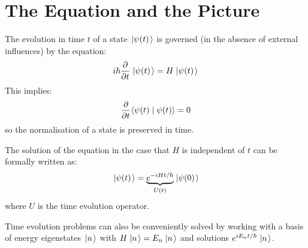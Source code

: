 \documentclass[../Main.tex]{subfiles}
\begin{document}
\section{The \schr Equation and the \schr Picture}
The evolution in time $t$ of a state $\left.\left|\psi(t)\right.\right\rangle$ is governed (in the absence of external influences) by the \schr equation:
\begin{equation}
    i\hbar \frac{\partial}{\partial t} \left.\left|\psi(t)\right.\right\rangle = H\left.\left|\psi(t)\right.\right\rangle
    \label{eqnSchrodinger}
\end{equation}
This implies:
\begin{equation*}
    \frac{\partial}{\partial t} \langle\psi(t)\mid\psi(t)\rangle = 0
\end{equation*}
so the normalisation of a state is preserved in time.

The solution of the \schr equation in the case that $H$ is independent of $t$ can be formally written as:
\begin{equation*}
    \left.\left|\psi(t)\right.\right\rangle = \underbrace{e^{-iHt / \hbar}}_{U(t)} \left.\left|\psi(0)\right.\right\rangle
\end{equation*}
where $U$ is the time evolution operator.

Time evolution problems can also be conveniently solved by working with a basis of energy eigenstates $\left.\left|n\right.\right\rangle$ with $H\left.\left|n\right.\right\rangle = E_n \left.\left|n\right.\right\rangle$ and solutions $e^{iE_n t / \hbar} \left.\left|n\right.\right\rangle$.
\end{document}
